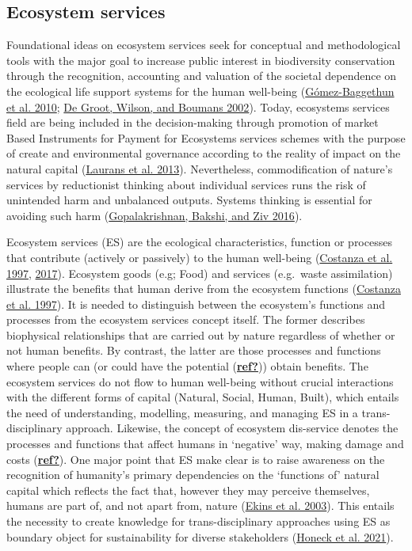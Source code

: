 \documentclass[
]{article}
\begin{document}
\label{background}

\hypertarget{ecosystem-services}{%
\subsection{Ecosystem services}\label{ecosystem-services}}

Foundational ideas on ecosystem services seek for conceptual and methodological tools with the major goal to increase public interest in biodiversity conservation through the recognition, accounting and valuation of the societal dependence on the ecological life support systems for the human well-being (\protect\hyperlink{ref-Gomez-Baggethun2010}{Gómez-Baggethun et al. 2010}; \protect\hyperlink{ref-DeGroot2002}{De Groot, Wilson, and Boumans 2002}).
Today, ecosystems services field are being included in the decision-making through promotion of market Based Instruments for Payment for Ecosystems services schemes with the purpose of create and environmental governance according to the reality of impact on the natural capital (\protect\hyperlink{ref-Laurans2013}{Laurans et al. 2013}).
Nevertheless, commodification of nature's services by reductionist thinking about individual services runs the risk of unintended harm and unbalanced outputs.
Systems thinking is essential for avoiding such harm (\protect\hyperlink{ref-Gopalakrishnan2016}{Gopalakrishnan, Bakshi, and Ziv 2016}).

Ecosystem services (ES) are the ecological characteristics, function or processes that contribute (actively or passively) to the human well-being (\protect\hyperlink{ref-Costanza1997}{Costanza et al. 1997}, \protect\hyperlink{ref-Costanza2017}{2017}). Ecosystem goods (e.g; Food) and services (e.g.~waste assimilation) illustrate the benefits that human derive from the ecosystem functions (\protect\hyperlink{ref-Costanza1997}{Costanza et al. 1997}).
It is needed to distinguish between the ecosystem's functions and processes from the ecosystem services concept itself. The former describes biophysical relationships that are carried out by nature regardless of whether or not human benefits.
By contrast, the latter are those processes and functions where people can (or could have the potential (\protect\hyperlink{ref-ref}{\textbf{ref?}})) obtain benefits. The ecosystem services do not flow to human well-being without crucial interactions with the different forms of capital (Natural, Social, Human, Built), which entails the need of understanding, modelling, measuring, and managing ES in a trans-disciplinary approach. Likewise, the concept of ecosystem dis-service denotes the processes and functions that affect humans in `negative' way, making damage and costs (\protect\hyperlink{ref-ref}{\textbf{ref?}}).
One major point that ES make clear is to raise awareness on the recognition of humanity's primary dependencies on the `functions of' natural capital which reflects the fact that, however they may perceive themselves, humans are part of, and not apart from, nature (\protect\hyperlink{ref-Ekins2003}{Ekins et al. 2003}). This entails the necessity to create knowledge for trans-disciplinary approaches using ES as boundary object for sustainability for diverse stakeholders (\protect\hyperlink{ref-Honeck2021}{Honeck et al. 2021}).
\end{document}
